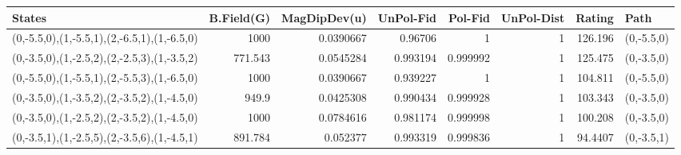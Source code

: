 \begin{tabular}{lrrrrrrl}
\hline
 States                                      &   B.Field(G) &   MagDipDev(u) &   UnPol-Fid &   Pol-Fid &   UnPol-Dist &   Rating & Path       \\
\hline
 (0,-5.5,0),(1,-5.5,1),(2,-6.5,1),(1,-6.5,0) &     1000     &      0.0390667 &    0.96706  &  1        &            1 & 126.196  & (0,-5.5,0) \\
 (0,-3.5,0),(1,-2.5,2),(2,-2.5,3),(1,-3.5,2) &      771.543 &      0.0545284 &    0.993194 &  0.999992 &            1 & 125.475  & (0,-3.5,0) \\
 (0,-5.5,0),(1,-5.5,1),(2,-5.5,3),(1,-6.5,0) &     1000     &      0.0390667 &    0.939227 &  1        &            1 & 104.811  & (0,-5.5,0) \\
 (0,-3.5,0),(1,-3.5,2),(2,-3.5,2),(1,-4.5,0) &      949.9   &      0.0425308 &    0.990434 &  0.999928 &            1 & 103.343  & (0,-3.5,0) \\
 (0,-3.5,0),(1,-2.5,2),(2,-3.5,2),(1,-4.5,0) &     1000     &      0.0784616 &    0.981174 &  0.999998 &            1 & 100.208  & (0,-3.5,0) \\
 (0,-3.5,1),(1,-2.5,5),(2,-3.5,6),(1,-4.5,1) &      891.784 &      0.052377  &    0.993319 &  0.999836 &            1 &  94.4407 & (0,-3.5,1) \\
\hline
\end{tabular}